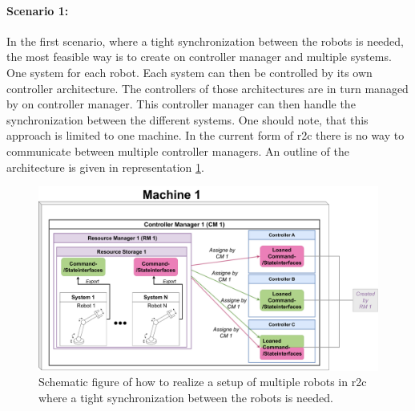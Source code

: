 \paragraph{Scenario 1:} 
In the first scenario, where a tight synchronization between the robots is needed, the most feasible way is to create on controller manager and multiple systems. One system for each robot. Each system can then be controlled by its own controller architecture. The controllers of those architectures are in turn managed by on controller manager. This controller manager can then handle the synchronization between the different systems.\newline
One should note, that this approach is limited to one machine. In the current form of \gls{r2c} there is no way to communicate between multiple controller managers. An outline of the architecture is given in representation \ref{c3_fig_r2c_mr_ts}.
\begin{figure}[htbp]
	\centering
	\includegraphics[width=1\textwidth]{Figures/c3/multiple_robots_one_system_current-Page-1.pdf}
	\caption{Schematic figure of how to realize a setup of multiple robots in \gls{r2c} where a tight synchronization between the robots is needed.}
	\label{c3_fig_r2c_mr_ts}
\end{figure}

